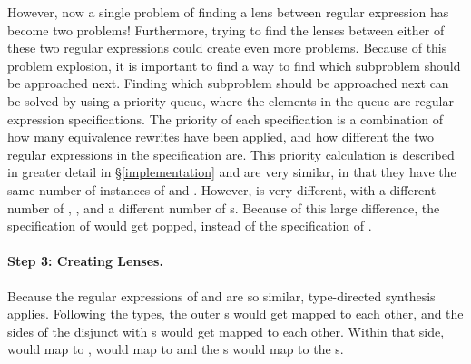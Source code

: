 \documentclass[numbers,10pt,preprint\ifanon ,nocopyrightspace\fi]{sigplanconf}
\begin{document}
However, now a single problem of finding a lens between regular expression has
become two problems!  Furthermore, trying to find the lenses between either of these
two regular expressions could create even more problems.  Because of this
problem explosion, it is
important to find a way to find which subproblem should be approached next.
Finding which subproblem should be approached next can be solved by using a
priority queue, where the
elements in the queue are regular expression specifications.  The priority of
each specification is a combination of how many equivalence rewrites have been
applied,
and how different the two regular expressions in the specification are.  This
priority calculation is described in greater detail in
\S\ref{implementation}
 and  are very similar, in that they have the same
number of instances of  and .  However,  is
very different, with a different number of , , and a
different number of \StarRegexType{}s.  Because of this large difference, the
specification of  would get popped, instead of the
specification of .

\paragraph*{Step 3: Creating Lenses.}
Because the regular expressions of   and  are so
similar, type-directed synthesis applies.
Following the types, the outer s
would get mapped to each other, and the sides of the disjunct with
\StarRegexType{}s
would get mapped to each other.  Within that side,  would map to
,  would map to  and the \StarRegexType{}s would map to the
\StarRegexType{}s.
\end{document}
